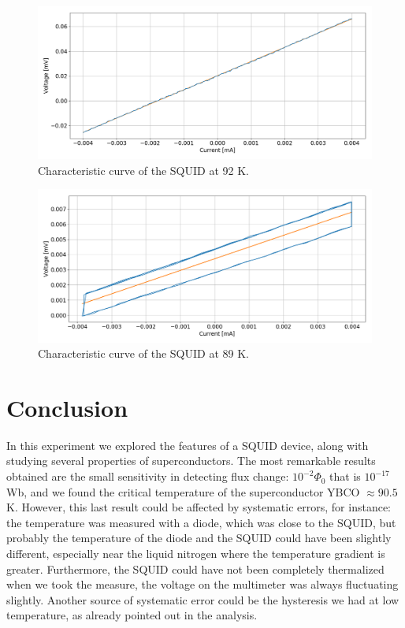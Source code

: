 \documentclass[a4paper,10pt]{article}
\begin{document}
\begin{figure}[H]
\centering
\includegraphics[width = \textwidth]{92K}
\caption{Characteristic curve of the SQUID at 92 K.}\label{92}
\end{figure}
\begin{figure}[H]
\centering
\includegraphics[width = \textwidth]{89K}
\caption{Characteristic curve of the SQUID at 89 K.}\label{89}
\end{figure}
\section{Conclusion}
In this experiment we explored the features of a SQUID device, along with studying several properties of superconductors. The most remarkable results obtained are the small sensitivity in detecting flux change: $10^{-2} \Phi_0$ that is $10^{-17}$ Wb, and we found the critical temperature of the superconductor YBCO $\approx 90.5$ K. However, this last result could be affected 
by systematic errors, for instance: the temperature was measured with a diode, which was close to the SQUID, but probably the temperature of the diode and the SQUID could have been slightly different, especially near the liquid nitrogen where the temperature gradient is greater. Furthermore, the SQUID could have not been completely thermalized when we took the measure, the voltage on the multimeter was always fluctuating slightly. Another source of systematic error could be the hysteresis we had at low temperature, as already pointed out in the analysis.
\end{document}
